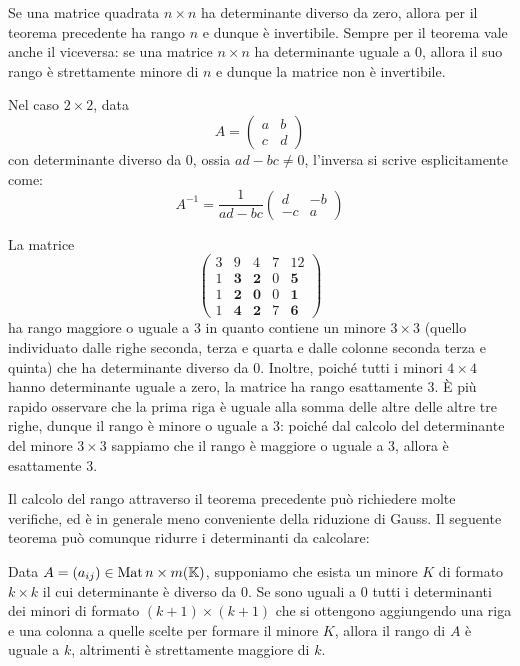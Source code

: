 \begin{observation}
	Se una matrice quadrata $n \times n$ ha determinante diverso da zero, allora
	per il teorema precedente ha rango $n$ e dunque è invertibile. Sempre per il
	teorema vale anche il viceversa: se una matrice $n \times n$ ha determinante
	uguale a 0, allora il suo rango è strettamente minore di $n$ e dunque la
	matrice non è invertibile.

	Nel caso $2 \times 2$, data
	\[
		A = \begin{pmatrix}
			a & b \\
			c & d
		\end{pmatrix}
	\]
	con determinante diverso da 0, ossia $ad - bc \neq 0$, l'inversa si scrive
	esplicitamente come:
	\[
		A^{-1} = \frac{1}{ad - bc} \begin{pmatrix}
			d  & -b \\
			-c & a
		\end{pmatrix}
	\]
\end{observation}

\begin{example}
	La matrice
	\[
		\begin{pmatrix}
			3 & 9          & 4          & 7 & 12         \\
			1 & \textbf{3} & \textbf{2} & 0 & \textbf{5} \\
			1 & \textbf{2} & \textbf{0} & 0 & \textbf{1} \\
			1 & \textbf{4} & \textbf{2} & 7 & \textbf{6}
		\end{pmatrix}
	\]
	ha rango maggiore o uguale a 3 in quanto contiene un minore $3 \times 3$
	(quello individuato dalle righe seconda, terza e quarta e dalle colonne
	seconda terza e quinta) che ha determinante diverso da 0. Inoltre, poiché
	tutti i minori $4 \times 4$ hanno determinante uguale a zero, la matrice ha
	rango esattamente 3. È più rapido osservare che la prima riga è uguale
	alla somma delle altre delle altre tre righe, dunque il rango è minore o
	uguale a 3: poiché dal calcolo del determinante del minore $3 \times 3$
	sappiamo che il rango è maggiore o uguale a 3, allora è esattamente 3.
\end{example}

Il calcolo del rango attraverso il teorema precedente può richiedere molte
verifiche, ed è in generale meno conveniente della riduzione di Gauss. Il
seguente teorema può comunque ridurre i determinanti da calcolare:

\begin{theorem}
	Data $A = (a_{ij}) \in \operatorname{Mat}{n \times m}(\mathbb{K})$, supponiamo che esista un minore $K$ di formato $k \times k$
	il cui determinante è diverso da 0. Se sono uguali a 0 tutti i determinanti dei minori di formato
	$(k + 1) \times (k + 1)$ che si ottengono aggiungendo una riga e una colonna a quelle scelte per formare il
	minore $K$, allora il rango di $A$ è uguale a $k$, altrimenti è strettamente maggiore di $k$.
\end{theorem}

